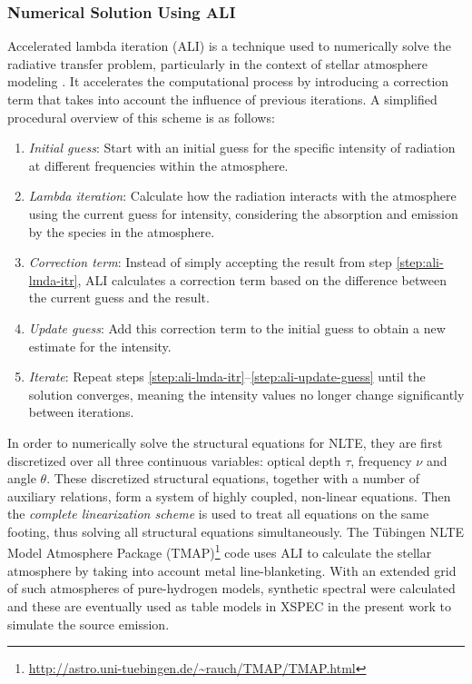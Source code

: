     		\subsubsection{Numerical Solution Using ALI}
    			Accelerated lambda iteration (ALI) is a technique used to numerically solve the radiative transfer problem, particularly in the context of stellar atmosphere modeling \cite{hubeny2003accelerated}. It accelerates the computational process by introducing a correction term that takes into account the influence of previous iterations. A simplified procedural overview of this scheme is as follows:
				\begin{enumerate}
					\item \textit{Initial guess}: Start with an initial guess for the specific intensity of radiation at different frequencies within the atmosphere. \label{step:ali-init-guess}
					\item \textit{Lambda iteration}: Calculate how the radiation interacts with the atmosphere using the current guess for intensity, considering the absorption and emission by the species in the atmosphere. \label{step:ali-lmda-itr}
					\item \textit{Correction term}: Instead of simply accepting the result from step \ref{step:ali-lmda-itr}, ALI calculates a correction term based on the difference between the current guess and the result. \label{step:ali-corr-term}
					\item \textit{Update guess}: Add this correction term to the initial guess to obtain a new estimate for the intensity. \label{step:ali-update-guess}
					\item \textit{Iterate}: Repeat steps \ref{step:ali-lmda-itr}--\ref{step:ali-update-guess} until the solution converges, meaning the intensity values no longer change significantly between iterations. \label{step:ali-iterate}
				\end{enumerate}
				
				In order to numerically solve the structural equations for NLTE, they are first discretized over all three continuous variables: optical depth $\tau$, frequency $\nu$ and angle $\theta$. These discretized structural equations, together with a number of auxiliary relations, form a system of highly coupled, non-linear equations. Then the \textit{complete linearization scheme} \cite{auer1970non} is used to treat all equations on the same footing, thus solving all structural equations simultaneously. The T\"{u}bingen NLTE Model Atmosphere Package (TMAP)\footnote{\url{http://astro.uni-tuebingen.de/~rauch/TMAP/TMAP.html}} code uses ALI to calculate the stellar atmosphere by taking into account metal line-blanketing. With an extended grid of such atmospheres of pure-hydrogen models, synthetic spectral were calculated and these are eventually used as table models in XSPEC in the present work to simulate the source emission.
    	
